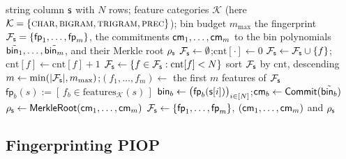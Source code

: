 \begin{algorithm}[h]
\caption{Fingerprint construction by the data owner.}
\label{alg:fp-commit}
\begin{algorithmic}[1]
\Require string column $\mathsf{s}$ with $N$ rows; feature categories $\mathcal{K}$ (here $\mathcal{K} = \{\textsc{char}, \textsc{bigram}, \textsc{trigram}, \textsc{prec}\}$); bin budget $m_{\max}$
\Ensure the fingerprint $\mathcal{F}_{\mathsf{s}} = \{\mathsf{fp}_1, \dots, \mathsf{fp}_m\}$, the commitments $\mathsf{cm}_1, \dots, \mathsf{cm}_m$ to the bin polynomials $\tilde{\mathsf{bin}_1}, \dots, \tilde{\mathsf{bin}_m}$, and their Merkle root $\rho_{\mathsf{s}}$
\State $\mathcal{F}_{\mathsf{s}} \gets \emptyset$;\quad $\mathrm{cnt}[\cdot] \gets 0$
    \State $\mathcal{F}_{\mathsf{s}} \gets \mathcal{F}_{\mathsf{s}} \cup \{f\}$;\quad $\mathrm{cnt}[f] \gets \mathrm{cnt}[f] + 1$
  \EndFor
\EndFor
\State $\mathcal{F}_{\mathsf{s}} \gets \{f \in \mathcal{F}_{\mathsf{s}} : \mathrm{cnt}[f] < N\}$
\State sort $\mathcal{F}_{\mathsf{s}}$ by $\mathrm{cnt}$, descending
\State $m \gets \min(|\mathcal{F}_{\mathsf{s}}|, m_{\max})$;\quad $(f_1, \dots, f_m) \gets$ the first $m$ features of $\mathcal{F}_{\mathsf{s}}$
 
  \State $\mathsf{fp}_b(s) := [\,f_b \in \mathrm{features}_{\mathcal{K}}(s)\,]$ 
  \State $\mathsf{bin}_b \gets \bigl(\mathsf{fp}_b(\mathsf{s}[i])\bigr)_{i \in [N]}$;\quad $\mathsf{cm}_b \gets \mathsf{Commit}(\tilde{\mathsf{bin}_b})$
\EndFor
\State $\rho_{\mathsf{s}} \gets \mathsf{MerkleRoot}(\mathsf{cm}_1, \dots, \mathsf{cm}_m)$
\State \Return $\mathcal{F}_{\mathsf{s}} \gets \{\mathsf{fp}_1, \dots, \mathsf{fp}_m\}$, $(\mathsf{cm}_1, \dots, \mathsf{cm}_m)$ and $\rho_{\mathsf{s}}$
\end{algorithmic}
\end{algorithm}

\subsection{Fingerprinting PIOP}
\label{sec:fp-piop}





